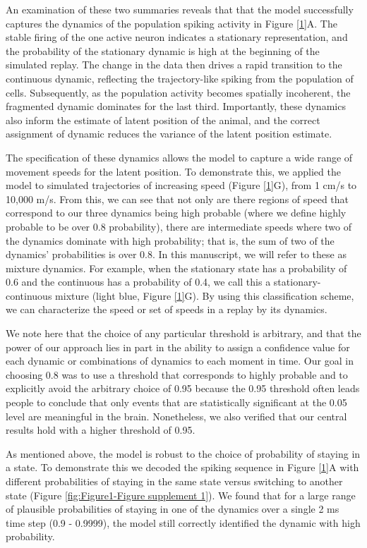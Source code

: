 \documentclass[times, twoside]{zHenriquesLab-StyleBioRxiv}
\begin{document}
An examination of these two summaries reveals that that the model successfully captures the dynamics of the population spiking activity in Figure \ref{1}A. The stable firing of the one active neuron indicates a stationary representation, and the probability of the stationary dynamic is high at the beginning of the simulated replay. The change in the data then drives a rapid transition to the continuous dynamic, reflecting the trajectory-like spiking from the population of cells. Subsequently, as the population activity becomes spatially incoherent, the fragmented dynamic dominates for the last third. Importantly, these dynamics also inform the estimate of latent position of the animal, and the correct assignment of dynamic reduces the variance of the latent position estimate.

The specification of these dynamics allows the model to capture a wide range of movement speeds for the latent position. To demonstrate this, we applied the model to simulated trajectories of increasing speed (Figure \ref{1}G), from 1 cm/s to 10,000 m/s. From this, we can see that not only are there regions of speed that correspond to our three dynamics being high probable (where we define highly probable to be over 0.8 probability), there are intermediate speeds where two of the dynamics dominate with high probability; that is, the sum of two of the dynamics' probabilities is over 0.8. In this manuscript, we will refer to these as mixture dynamics. For example, when the stationary state has a probability of 0.6 and the continuous has a probability of 0.4, we call this a stationary-continuous mixture (light blue, Figure \ref{1}G). By using this classification scheme, we can characterize the speed or set of speeds in a replay by its dynamics.

We note here that the choice of any particular threshold is arbitrary, and that the power of our approach lies in part in the ability to assign a confidence value for each dynamic or combinations of dynamics to each moment in time. Our goal in choosing 0.8 was to use a threshold that corresponds to highly probable and to explicitly avoid the arbitrary choice of 0.95 because the 0.95 threshold often leads people to conclude that only events that are statistically significant at the 0.05 level are meaningful in the brain. Nonetheless, we also verified that our central results hold with a higher threshold of 0.95. 

As mentioned above, the model is robust to the choice of probability of staying in a state. To demonstrate this we decoded the spiking sequence in Figure \ref{1}A with different probabilities of staying in the same state versus switching to another state (Figure \ref{fig:Figure1-Figure supplement 1}). We found that for a large range of plausible probabilities of staying in one of the dynamics over a single 2 ms time step (0.9 - 0.9999), the model still correctly identified the dynamic with high probability.
\end{document}
